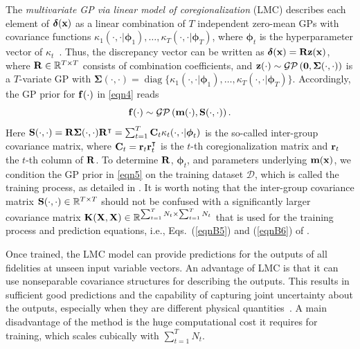 \documentclass[iicol,sn-basic]{sn-jnl}%
\DeclareMathOperator{\diag}{diag}
\begin{document}
The \textit{multivariate GP via linear model of coregionalization} (LMC) describes each element of ${\boldsymbol \delta}({\bf x})$ as a linear combination of $T$ independent zero-mean GPs with covariance functions $\kappa_1(\cdot,\cdot|{\boldsymbol \phi}_1),\dots,\kappa_T(\cdot,\cdot|{\boldsymbol \phi}_T)$, where ${\boldsymbol \phi}_t$ is the hyperparameter vector of $\kappa_t$~\citep[see e.g.,][]{Chiles1999,Fricker2013}.
Thus, the discrepancy vector can be written as ${\boldsymbol \delta}({\bf x}) = {\bf R} {\bf z}({\bf x})$, where ${\bf R} \in \mathbb{R}^{T \times T}$ consists of combination coefficients, and ${\bf z}(\cdot) \sim \mathcal{GP}\left({\bf 0},{\boldsymbol \Sigma}(\cdot,\cdot)\right)$ is a $T$-variate GP with ${\boldsymbol \Sigma}(\cdot,\cdot) = \diag\{\kappa_1(\cdot,\cdot|{\boldsymbol \phi}_1),\dots,\kappa_T(\cdot,\cdot|{\boldsymbol \phi}_T)\}$.
Accordingly, the GP prior for ${\bf f}(\cdot)$ in \cref{eqn4} reads
\begin{equation}\label{eqn5}
	{\bf f}(\cdot) \sim \mathcal{GP}\left({\bf m}(\cdot),{\bf S}(\cdot,\cdot)\right).
\end{equation}
Here 
${\bf S}(\cdot,\cdot) = {\bf R} {\boldsymbol \Sigma}(\cdot,\cdot) {\bf R}^\intercal = \sum_{t=1}^T {\bf C}_t \kappa_t(\cdot,\cdot|{\boldsymbol \phi}_t)$ is the so-called inter-group covariance matrix, where ${\bf C}_t = {\bf r}_t {\bf r}_t^\intercal$ is the $t$-th coregionalization matrix and ${\bf r}_t$ the $t$-th column of ${\bf R}$.
To determine ${\bf R}$, ${\boldsymbol \phi}_t$, and parameters underlying ${\bf m}({\bf x})$, we condition the GP prior in \cref{eqn5} on the training dataset $\mathcal{D}$, which is called the training process, as detailed in . 
It is worth noting that the inter-group covariance matrix ${\bf S}(\cdot,\cdot) \in \mathbb{R}^{T \times T}$ should not be confused with a significantly larger covariance matrix ${\bf K}({\bf X},{\bf X}) \in \mathbb{R}^{\sum_{t=1}^{T}N_t \times \sum_{t=1}^{T}N_t}$ that is used for the training process and prediction equations, i.e., Eqs.~(\ref{eqnB5}) and (\ref{eqnB6}) of .

Once trained, the LMC model can provide predictions for the outputs of all fidelities at unseen input variable vectors.
An advantage of LMC is that it can use nonseparable covariance structures for describing the outputs.
This results in sufficient good predictions and the capability of capturing joint uncertainty about the outputs, especially when they are different physical quantities~\citep{Fricker2013}.
A main disadvantage of the method is the huge computational cost it requires for training, which scales cubically with $\sum_{t=1}^{T}N_t$.
\end{document}
